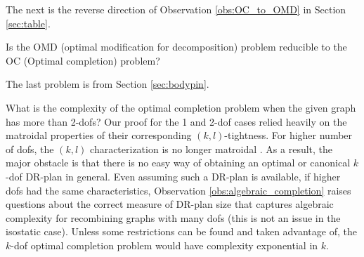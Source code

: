 The next is the reverse direction of Observation \ref{obs:OC_to_OMD} in Section \ref{sec:table}.

\begin{openproblem}
    Is the OMD (optimal modification for decomposition) problem
    reducible to the OC (Optimal completion) problem?
\end{openproblem}

The last problem is from
Section \ref{sec:bodypin}.

\begin{openproblem}
    What is the complexity of the optimal completion problem when the given
    graph has more than 2-dofs?
    Our proof for the 1 and 2-dof cases relied heavily on the matroidal
    properties of their corresponding $(k,l)$-tightness.
    For higher number of dofs, the $(k,l)$ characterization is
    no longer matroidal \cite{Lee:2007:PGA}.
    As a result, the major obstacle is that
    there is no easy way of obtaining an optimal or canonical
    $k$-dof DR-plan in general.
    Even assuming such  a DR-plan is available,
    if higher dofs had the same characteristics,
    Observation \ref{obs:algebraic_completion}
    raises questions about the correct measure of DR-plan size that
    captures algebraic complexity for recombining graphs with many dofs
    (this is not an issue in the isostatic case). Unless some restrictions
    can be found and taken advantage of, the $k$-dof optimal
    completion problem would  have complexity exponential in $k$.
\end{openproblem}


